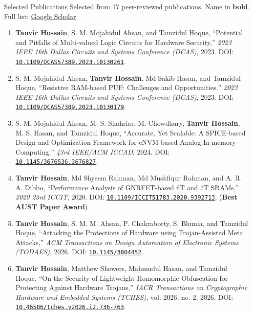 \begin{rSection}{Selected Publications}
\newcommand{\doi}[1]{DOI: \href{https://doi.org/#1}{\nolinkurl{#1}}}
\vspace{0.05cm}
Selected from 17 peer-reviewed publications. Name in \textbf{bold}. Full list: \href{https://scholar.google.com/citations?user=lPEOU2wAAAAJ&hl=en}{Google Scholar}.
\vspace{0.1cm}

\begin{enumerate}[label=\arabic*.]
    \item \textbf{Tanvir Hossain}, S. M. Mojahidul Ahsan, and Tamzidul Hoque, ``Potential and Pitfalls of Multi-valued Logic Circuits for Hardware Security,'' \emph{2023 IEEE 16th Dallas Circuits and Systems Conference (DCAS)}, 2023. \doi{10.1109/DCAS57389.2023.10130261}.

    \item S. M. Mojahidul Ahsan, \textbf{Tanvir Hossain}, Md Sakib Hasan, and Tamzidul Hoque, ``Resistive RAM-based PUF: Challenges and Opportunities,'' \emph{2023 IEEE 16th Dallas Circuits and Systems Conference (DCAS)}, 2023. \doi{10.1109/DCAS57389.2023.10130179}.

    \item S. M. Mojahidul Ahsan, M. S. Shahriar, M. Chowdhury, \textbf{Tanvir Hossain}, M. S. Hasan, and Tamzidul Hoque, ``Accurate, Yet Scalable: A SPICE-based Design and Optimization Framework for eNVM-based Analog In-memory Computing,'' \emph{43rd IEEE/ACM ICCAD}, 2024. \doi{10.1145/3676536.3676827}.

    \item \textbf{Tanvir Hossain}, Md Shyeem Rahman, Md Mushfiqur Rahman, and A. R. A. Dibbo, ``Performance Analysis of GNRFET-based 6T and 7T SRAMs,'' \emph{2020 23rd ICCIT}, 2020. \doi{10.1109/ICCIT51783.2020.9392713}. (\textbf{Best AUST Paper Award})

    \item \textbf{Tanvir Hossain}, S. M. M. Ahsan, P. Chakraborty, S. Bhunia, and Tamzidul Hoque, ``Attacking the Protections of Hardware using Trojan-Assisted Meta Attacks,'' \emph{ACM Transactions on Design Automation of Electronic Systems (TODAES)}, 2026. \doi{10.1145/3804452}.

    \item \textbf{Tanvir Hossain}, Matthew Showers, Mahmudul Hasan, and Tamzidul Hoque, ``On the Security of Lightweight Homomorphic Obfuscation for Protecting Against Hardware Trojans,'' \emph{IACR Transactions on Cryptographic Hardware and Embedded Systems (TCHES)}, vol. 2026, no. 2, 2026. \doi{10.46586/tches.v2026.i2.736-763}.
\end{enumerate}
\end{rSection}
